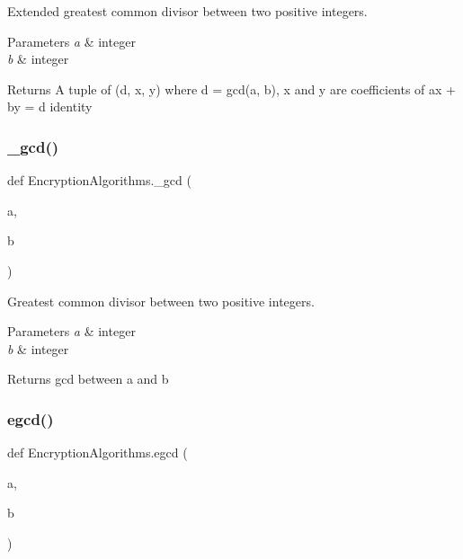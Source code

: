 Extended greatest common divisor between two positive integers. 


\begin{DoxyParams}{Parameters}
{\em a} & integer \\
\hline
{\em b} & integer\\
\hline
\end{DoxyParams}
\begin{DoxyReturn}{Returns}
A tuple of (d, x, y) where d = gcd(a, b), x and y are coefficients of ax + by = d identity 
\end{DoxyReturn}
\mbox{\label{namespaceEncryptionAlgorithms_a579c44082c46469c685af4fa13b7087e}} 
\subsubsection{\texorpdfstring{\+\_\+gcd()}{\_gcd()}}
{\footnotesize\ttfamily def Encryption\+Algorithms.\+\_\+gcd (\begin{DoxyParamCaption}\item[{}]{a,  }\item[{}]{b }\end{DoxyParamCaption})\hspace{0.3cm}{\ttfamily [private]}}



Greatest common divisor between two positive integers. 


\begin{DoxyParams}{Parameters}
{\em a} & integer \\
\hline
{\em b} & integer\\
\hline
\end{DoxyParams}
\begin{DoxyReturn}{Returns}
gcd between a and b 
\end{DoxyReturn}
\mbox{\label{namespaceEncryptionAlgorithms_a8202b546cf0698eece91364d04351eac}} 
\subsubsection{\texorpdfstring{egcd()}{egcd()}}
{\footnotesize\ttfamily def Encryption\+Algorithms.\+egcd (\begin{DoxyParamCaption}\item[{}]{a,  }\item[{}]{b }\end{DoxyParamCaption})}




